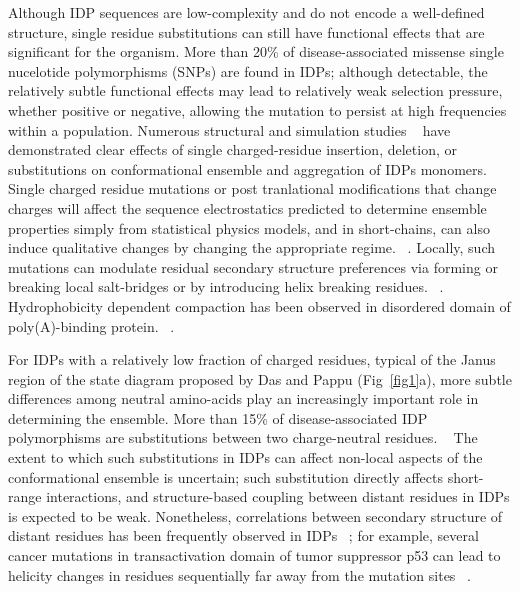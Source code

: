 \documentclass[journal=jacsat,manuscript=article]{achemso}
\begin{document}
Although IDP sequences are low-complexity and do not encode a well-defined structure, single residue substitutions can still have functional effects that are significant for the organism.  More than 20\% of disease-associated missense single nucelotide polymorphisms (SNPs) are found in IDPs;\cite{Vacic2012a} although detectable, the relatively subtle functional effects may lead to relatively weak selection pressure, whether positive or negative, allowing the mutation to persist at high frequencies within a population.  Numerous structural and simulation studies ~\cite{Larini2013b,Ganguly2015,Viet2014a,Viet2013,Truong2014a,Zhan2013a,Xu2013a} have demonstrated clear effects of single charged-residue insertion, deletion, or substitutions on conformational ensemble and aggregation of IDPs monomers. Single charged residue mutations or post tranlational modifications that change charges will affect the sequence electrostatics %
predicted to determine ensemble properties simply from statistical physics models, and in short-chains, can also induce qualitative changes by changing the appropriate regime. ~\cite{Das2015,Larini2013b,Bah2016,He2015}. 
Locally, such mutations can modulate residual secondary structure preferences via forming or breaking local salt-bridges or by introducing helix breaking residues. ~\cite{AlexanderConicella2016,Ganguly2015,Zhan2013a}. Hydrophobicity dependent compaction has been observed in disordered domain of poly(A)-binding protein. ~\cite {Riback2017}.
  
For IDPs with a relatively low fraction of charged residues, typical of the Janus region of the state diagram proposed by Das and Pappu\cite{Das2015,Das2013a} (Fig~\ref{fig1}a), more subtle differences among neutral amino-acids  play an increasingly important role in determining the ensemble.  More than 15\% of disease-associated IDP polymorphisms are substitutions between two charge-neutral residues. ~\cite {Vacic2012a} The extent to which such substitutions in IDPs can affect non-local aspects of the conformational ensemble is uncertain;  such substitution directly affects short-range interactions, and structure-based coupling between distant residues in IDPs is expected to be weak.  Nonetheless, correlations between secondary structure of distant residues has been frequently observed in IDPs ~\cite{Ganguly2015,Iesmantavicius2013}; for example, several cancer mutations in transactivation domain of tumor suppressor p53 can lead to helicity changes in residues sequentially far away from the mutation sites ~\cite{Ganguly2015}.
\end{document}

